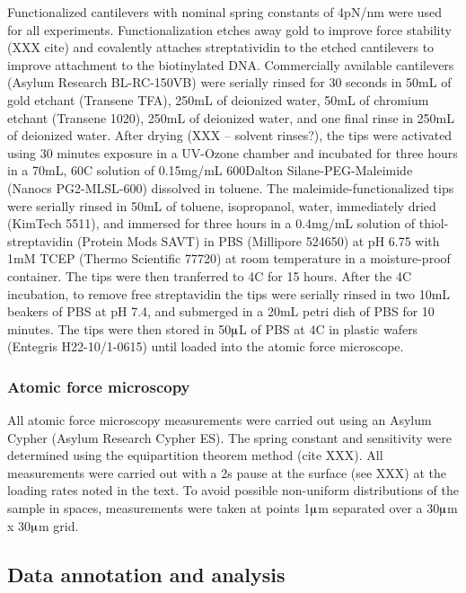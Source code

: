 \documentclass[%
  aip,12pt,tightenlines,
  amsthm,
 amsmath,amssymb
]{article}
\newcommand{\sLabel}[1]{\label{section:#1}}
\newcommand{\firstp}[0]{}
\newcommand{\pl}[0]{\vspace{6pt}}
\newcommand{\supply}[2]{(#1 #2)}
\newcommand{\degreeC}[0]{\degree{}C}
\begin{document}
\firstp Functionalized cantilevers with nominal spring constants of 4pN/nm  were used for all experiments. Functionalization etches away gold to improve force stability (XXX cite) and covalently attaches streptatividin to the etched cantilevers to improve attachment to the biotinylated DNA. Commercially available cantilevers \supply{Asylum Research}{BL-RC-150VB} were serially rinsed for 30 seconds in 50mL of gold etchant \supply{Transene}{TFA}, 250mL of deionized water, 50mL of chromium etchant \supply{Transene}{1020}, 250mL of deionized water, and one final rinse in 250mL of deionized water. After drying (XXX -- solvent rinses?), the tips were activated using 30 minutes exposure in a UV-Ozone chamber and incubated for three hours in a 70mL, 60\degreeC{} solution of 0.15mg/mL 600Dalton Silane-PEG-Maleimide \supply{Nanocs}{PG2-MLSL-600} dissolved in toluene. The maleimide-functionalized tips were serially rinsed in 50mL of toluene, isopropanol, water, immediately dried \supply{KimTech}{5511}, and immersed for three hours in a 0.4mg/mL solution of thiol-streptavidin \supply{Protein Mods}{SAVT} in PBS \supply{Millipore}{524650} at pH 6.75 with 1mM TCEP \supply{Thermo Scientific}{77720} at room temperature in a moisture-proof container. The tips were then tranferred to 4\degreeC{} for 15 hours. After the 4\degreeC{} incubation, to remove free streptavidin the tips were serially rinsed in two 10mL beakers of PBS at pH 7.4, and submerged in a 20mL petri dish of PBS for 10 minutes. The tips were then stored in 50$\muup$L of PBS at 4C in plastic wafers \supply{Entegris}{H22-10/1-0615} until loaded into the atomic force microscope. \pl

\subsubsection{\sLabel{Surface}Atomic force microscopy}

All atomic force microscopy measurements were carried out using an Asylum Cypher \supply{Asylum Research}{Cypher ES}. The spring constant and sensitivity were determined using the equipartition theorem method (cite XXX). All measurements were carried out with a 2s pause at the surface (see XXX) at the loading rates noted in the text. To avoid possible non-uniform distributions of the sample in spaces, measurements were taken at points 1$\muup$m separated over a 30$\muup$m x 30$\muup$m grid. 

\subsection{\sLabel{Surface}Data annotation and analysis}
\end{document}
